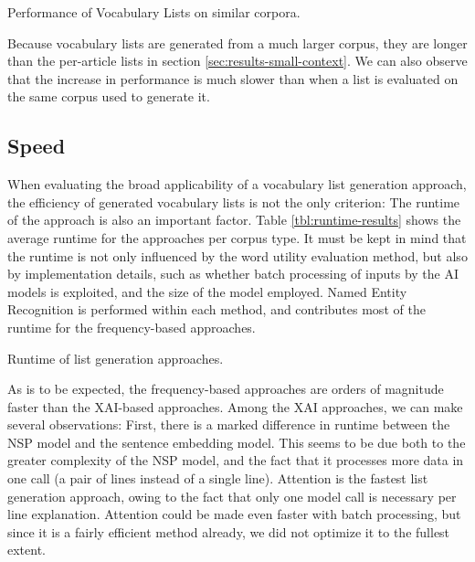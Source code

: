 \begin{table}[ht]
	\centering
	
	\caption{Performance of Vocabulary Lists on similar corpora.}
	\label{tbl:runtime-results-wikipedia-categories}
\end{table}

Because vocabulary lists are generated from a much larger corpus, they are longer than the per-article lists in section \ref{sec:results-small-context}.
We can also observe that the increase in performance is much slower than when a list is evaluated on the same corpus used to generate it.



\subsection{Speed}
When evaluating the broad applicability of a vocabulary list generation approach, the efficiency of generated vocabulary lists is not the only criterion:
The runtime of the approach is also an important factor.
Table \ref{tbl:runtime-results} shows the average runtime for the approaches per corpus type.
It must be kept in mind that the runtime is not only influenced by the word utility evaluation method, but also by implementation details, such as whether batch processing of inputs by the AI models is exploited, and the size of the model employed.
Named Entity Recognition is performed within each method, and contributes most of the runtime for the frequency-based approaches.

\begin{table}[ht]
	\centering
	
	\caption{Runtime of list generation approaches.}
	\label{tbl:runtime-results}
\end{table}

As is to be expected, the frequency-based approaches are orders of magnitude faster than the XAI-based approaches.
Among the XAI approaches, we can make several observations:
First, there is a marked difference in runtime between the NSP model and the sentence embedding model.
This seems to be due both to the greater complexity of the NSP model, and the fact that it processes more data in one call (a pair of lines instead of a single line).
Attention is the fastest list generation approach, owing to the fact that only one model call is necessary per line explanation.
Attention could be made even faster with batch processing, but since it is a fairly efficient method already, we did not optimize it to the fullest extent.

